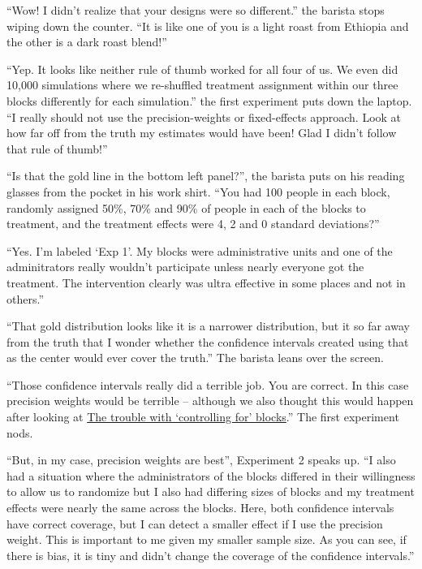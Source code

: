 \documentclass[
]{article}
\begin{document}
``Wow! I didn't realize that your designs were so different.'' the barista stops wiping down the counter. ``It is like one of you is a light roast from Ethiopia and the other is a dark roast blend!''

``Yep. It looks like neither rule of thumb worked for all four of us. We even did 10,000 simulations where we re-shuffled treatment assignment within our three blocks differently for each simulation.'' the first experiment puts down the laptop. ``I really should not use the precision-weights or fixed-effects approach. Look at how far off from the truth my estimates would have been! Glad I didn't follow that rule of thumb!''

``Is that the gold line in the bottom left panel?'', the barista puts on his reading glasses from the pocket in his work shirt. ``You had 100 people in each block, randomly assigned 50\%, 70\% and 90\% of people in each of the blocks to treatment, and the treatment effects were 4, 2 and 0 standard deviations?''

``Yes. I'm labeled `Exp 1'. My blocks were administrative units and one of the adminitrators really wouldn't participate unless nearly everyone got the treatment. The intervention clearly was ultra effective in some places and not in others.''

``That gold distribution looks like it is a narrower distribution, but it so far away from the truth that I wonder whether the confidence intervals created using that as the center would ever cover the truth.'' The barista leans over the screen.

``Those confidence intervals really did a terrible job. You are correct. In this case precision weights would be terrible -- although we also thought this would happen after looking at \href{https://declaredesign.org/blog/biased-fixed-effects.html}{The trouble with `controlling for' blocks}.'' The first experiment nods.

``But, in my case, precision weights are best'', Experiment 2 speaks up. ``I also had a situation where the administrators of the blocks differed in their willingness to allow us to randomize but I also had differing sizes of blocks and my treatment effects were nearly the same across the blocks. Here, both confidence intervals have correct coverage, but I can detect a smaller effect if I use the precision weight. This is important to me given my smaller sample size. As you can see, if there is bias, it is tiny and didn't change the coverage of the confidence intervals.''
\end{document}
